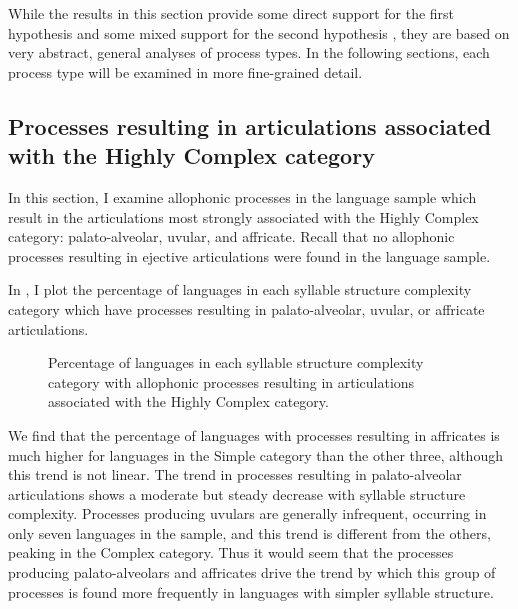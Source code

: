   While the results in this section provide some direct support for the first hypothesis  and some mixed support for the second hypothesis , they are based on very abstract, general analyses of process types. In the following sections, each process type will be examined in more fine-grained detail.

\subsection{Processes resulting in articulations associated with the Highly Complex category}\label{sec:7.3.2}

  In this section, I examine allophonic processes in the language sample which result in the articulations most strongly associated with the Highly Complex category: palato-alveolar, uvular, and affricate. Recall that no allophonic processes resulting in ejective articulations were found in the language sample.

  In , I plot the percentage of languages in each syllable structure complexity category which have processes resulting in palato-alveolar, uvular, or affricate articulations.

\begin{figure}
\caption{\label{fig:7.6}Percentage of languages in each syllable structure complexity category with allophonic processes resulting in articulations associated with the Highly Complex category.}
\end{figure}
  We find that the percentage of languages with processes resulting in affricates is much higher for languages in the Simple category than the other three, although this trend is not linear. The trend in processes resulting in palato-alveolar articulations shows a moderate but steady decrease with syllable structure complexity. Processes producing uvulars are generally infrequent, occurring in only seven languages in the sample, and this trend is different from the others, peaking in the Complex category. Thus it would seem that the processes producing pa\-la\-to-alveolars and affricates drive the trend by which this group of processes is found more frequently in languages with simpler syllable structure.

